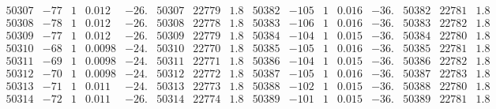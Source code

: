 \documentclass[11pt,reqno,a4letter]{article}
\numberwithin{figure}{section}
\numberwithin{table}{section}
\theoremstyle{plain}
\numberwithin{theorem}{section}
\theoremstyle{definition}
\begin{document}
\begin{table}[ht]
\begin{equation*}
{\begin{array}{ccccc|ccc||ccccc|ccc}
50307 & -77 & 1 & 0.012 & -26. & 50307 & 22779 & 1.8 & 50382 & -105 & 1 & 0.016 & -36. & 50382 & 22781 & 1.8  \\
50308 & -78 & 1 & 0.012 & -26. & 50308 & 22778 & 1.8 & 50383 & -106 & 1 & 0.016 & -36. & 50383 & 22782 & 1.8  \\
50309 & -77 & 1 & 0.012 & -26. & 50309 & 22779 & 1.8 & 50384 & -104 & 1 & 0.015 & -36. & 50384 & 22780 & 1.8  \\
50310 & -68 & 1 & 0.0098 & -24. & 50310 & 22770 & 1.8 & 50385 & -105 & 1 & 0.016 & -36. & 50385 & 22781 & 1.8  \\
50311 & -69 & 1 & 0.0098 & -24. & 50311 & 22771 & 1.8 & 50386 & -104 & 1 & 0.015 & -36. & 50386 & 22782 & 1.8  \\
50312 & -70 & 1 & 0.0098 & -24. & 50312 & 22772 & 1.8 & 50387 & -105 & 1 & 0.016 & -36. & 50387 & 22783 & 1.8  \\
50313 & -71 & 1 & 0.011 & -24. & 50313 & 22773 & 1.8 & 50388 & -102 & 1 & 0.015 & -36. & 50388 & 22780 & 1.8  \\
50314 & -72 & 1 & 0.011 & -26. & 50314 & 22774 & 1.8 & 50389 & -101 & 1 & 0.015 & -36. & 50389 & 22781 & 1.8  \\
\end{array} 
}
\end{equation*} 
\clearpage 

\end{table} 

\clearpage 
\end{document}
